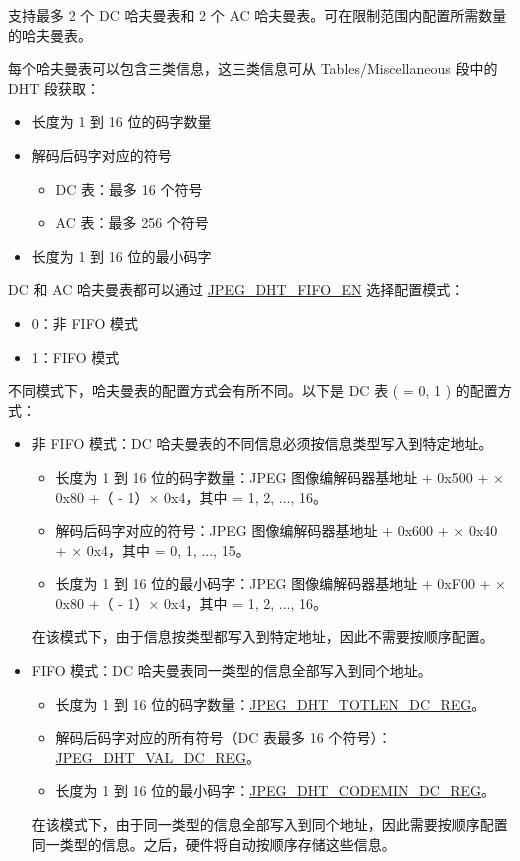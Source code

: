 \documentclass[main\_\_CN.tex]{subfiles}
\begin{document}
\chipname{} 支持最多 2 个 DC 哈夫曼表和 2 个 AC 哈夫曼表。可在限制范围内配置所需数量的哈夫曼表。

每个哈夫曼表可以包含三类信息，这三类信息可从 Tables/Miscellaneous 段中的 DHT 段获取：
\begin{itemize}
    \item 长度为 1 到 16 位的码字数量
    \item 解码后码字对应的符号
    \begin{itemize}
        \item DC 表：最多 16 个符号
        \item AC 表：最多 256 个符号
    \end{itemize}
    \item 长度为 1 到 16 位的最小码字
\end{itemize}

DC 和 AC 哈夫曼表都可以通过 \hyperref[fielddesc:JPEGDHTFIFOEN]{JPEG\_DHT\_FIFO\_EN} 选择配置模式：
\begin{itemize}
    \item 0：非 FIFO 模式
    \item 1：FIFO 模式
\end{itemize}

不同模式下，哈夫曼表的配置方式会有所不同。以下是 DC 表 ( = 0, 1 ) 的配置方式：
\begin{itemize}
    \item 非 FIFO 模式：DC 哈夫曼表的不同信息必须按信息类型写入到特定地址。
    \begin{itemize}
        \item 长度为 1 到 16 位的码字数量：JPEG 图像编解码器基地址 + 0x500 +  × 0x80 +（ - 1）× 0x4，其中  = 1, 2, ..., 16。
        \item 解码后码字对应的符号：JPEG 图像编解码器基地址 + 0x600 +  × 0x40 +  × 0x4，其中  = 0, 1, ..., 15。
        \item 长度为 1 到 16 位的最小码字：JPEG 图像编解码器基地址 + 0xF00 +  × 0x80 +（ - 1）× 0x4，其中  = 1, 2, ..., 16。
    \end{itemize}
    在该模式下，由于信息按类型都写入到特定地址，因此不需要按顺序配置。
    \item FIFO 模式：DC 哈夫曼表同一类型的信息全部写入到同个地址。
    \begin{itemize}
        \item 长度为 1 到 16 位的码字数量：\hyperref[regdesc:JPEGDHTTOTLENDC0REG]{JPEG\_DHT\_TOTLEN\_DC\_REG}。
        \item 解码后码字对应的所有符号（DC 表最多 16 个符号）：\hyperref[regdesc:JPEGDHTVALDC0REG]{JPEG\_DHT\_VAL\_DC\_REG}。
        \item 长度为 1 到 16 位的最小码字：\hyperref[regdesc:JPEGDHTCODEMINDC0REG]{JPEG\_DHT\_CODEMIN\_DC\_REG}。
    \end{itemize}
    在该模式下，由于同一类型的信息全部写入到同个地址，因此需要按顺序配置同一类型的信息。之后，硬件将自动按顺序存储这些信息。
\end{itemize}
\end{document}
